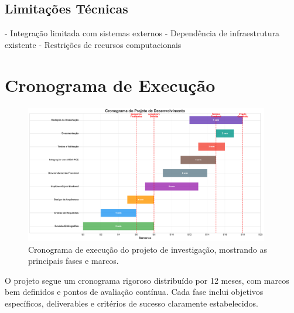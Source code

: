 \subsection{Limitações Técnicas}

- Integração limitada com sistemas externos
- Dependência de infraestrutura existente
- Restrições de recursos computacionais

\section{Cronograma de Execução}

\begin{figure}[htbp]
    \centering
    \includegraphics[width=0.95\textwidth]{images/generated/project_timeline.png}
    \caption{Cronograma de execução do projeto de investigação, mostrando as principais fases e marcos.}
    \label{fig:project-timeline}
\end{figure}

O projeto segue um cronograma rigoroso distribuído por 12 meses, com marcos bem definidos e pontos de avaliação contínua. Cada fase inclui objetivos específicos, deliverables e critérios de sucesso claramente estabelecidos. 